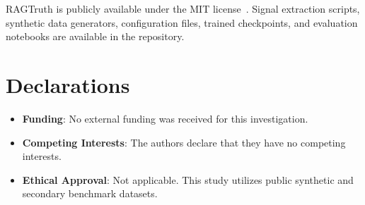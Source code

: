 \documentclass[pdflatex,sn-mathphys,Numbered]{sn-jnl}
\begin{document}
\backmatter

RAGTruth is publicly available under the MIT license~\cite{niu2024ragtruth}. Signal extraction scripts, synthetic data generators, configuration files, trained checkpoints, and evaluation notebooks are available in the repository.

\section*{Declarations}
\begin{itemize}
\item \textbf{Funding}: No external funding was received for this investigation.
\item \textbf{Competing Interests}: The authors declare that they have no competing interests.
\item \textbf{Ethical Approval}: Not applicable. This study utilizes public synthetic and secondary benchmark datasets.
\end{itemize}


\end{document}
